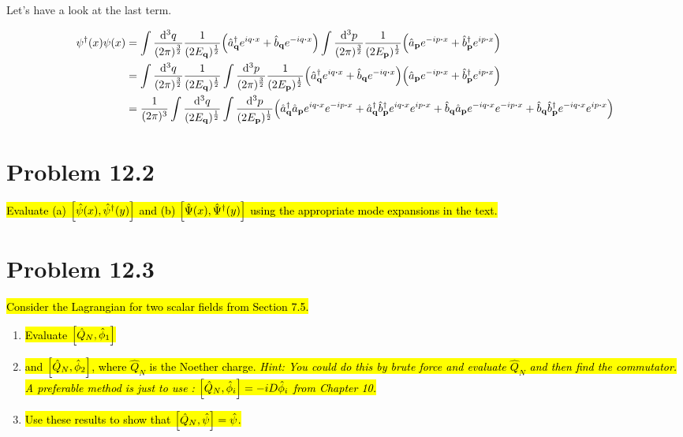 \documentclass{article}
\begin{document}
Let's have a look at the last term.

\begin{align*}
    \psi^\dagger(x)\psi(x) & =\int \frac{\dd[3]{q}}{(2\pi)^\frac{3}{2}}  \frac{1}{(2E_{\vb{q}})^{\frac{1}{2}}}\pqty{\hat{a}^\dagger_{\vb{q}}e^{iq\vdot x}+\hat{b}_{\vb{q}}e^{-iq\vdot x}}\int \frac{\dd[3]{p}}{(2\pi)^\frac{3}{2}}  \frac{1}{(2E_{\vb{p}})^{\frac{1}{2}}}  \pqty{\hat{a}_{\vb{p}}e^{-ip\vdot x}+\hat{b}^\dagger_{\vb{p}}e^{ip\vdot x}}                                                                                           \\
                           & =\int \frac{\dd[3]{q}}{(2\pi)^\frac{3}{2}}  \frac{1}{(2E_{\vb{q}})^{\frac{1}{2}}}\int \frac{\dd[3]{p}}{(2\pi)^\frac{3}{2}}  \frac{1}{(2E_{\vb{p}})^{\frac{1}{2}}}\pqty{\hat{a}^\dagger_{\vb{q}}e^{iq\vdot x}+\hat{b}_{\vb{q}}e^{-iq\vdot x}}    \pqty{\hat{a}_{\vb{p}}e^{-ip\vdot x}+\hat{b}^\dagger_{\vb{p}}e^{ip\vdot x}}                                                                                         \\
                           & =\frac{1}{(2\pi)^3}\int   \frac{\dd[3]{q}}{(2E_{\vb{q}})^{\frac{1}{2}}}\int   \frac{\dd[3]{p}}{(2E_{\vb{p}})^{\frac{1}{2}}}  \pqty{\hat{a}^\dagger_{\vb{q}}\hat{a}_{\vb{p}}e^{iq\vdot x}e^{-ip\vdot x}+\hat{a}^\dagger_{\vb{q}}\hat{b}^\dagger_{\vb{p}}e^{iq\vdot x}e^{ip\vdot x}+\hat{b}_{\vb{q}}\hat{a}_{\vb{p}}e^{-iq\vdot x}e^{-ip\vdot x}+\hat{b}_{\vb{q}}\hat{b}^\dagger_{\vb{p}}e^{-iq\vdot x}e^{ip\vdot x}} \\
\end{align*}

\section*{Problem 12.2}
\begin{quoting}
    \hl{Evaluate (a) $\bqty{\hat{\psi}(x),\hat{\psi}^\dagger (y)}$ and (b) $\bqty{\hat{\Psi}(x),\hat{\Psi}^\dagger (y)}$ using the appropriate mode expansions in the text.}
\end{quoting}


\section*{Problem 12.3}
\begin{quoting}
    \hl{Consider the Lagrangian for two scalar fields from Section 7.5.}
    \begin{enumerate}[label=(\alph*)]
        \item \hl{Evaluate $\bqty{\hat{Q}_N,\hat{\phi}_1}$}
        \item \hl{and $\bqty{\hat{Q}_N,\hat{\phi}_2}$, where $\hat{Q}_N$ is the Noether charge. \emph{Hint: You could do this by brute force and evaluate $\hat{Q}_N$ and then find the commutator. A preferable method is just to use : $\bqty{\hat{Q}_N,\hat{\phi}_i}=-iD\hat{\phi}_i$ from Chapter 10.}}
        \item \hl{Use these results to show that $\bqty{\hat{Q}_N,\hat{\psi}}=\hat{\psi}$.}
    \end{enumerate}
\end{quoting}
\end{document}

